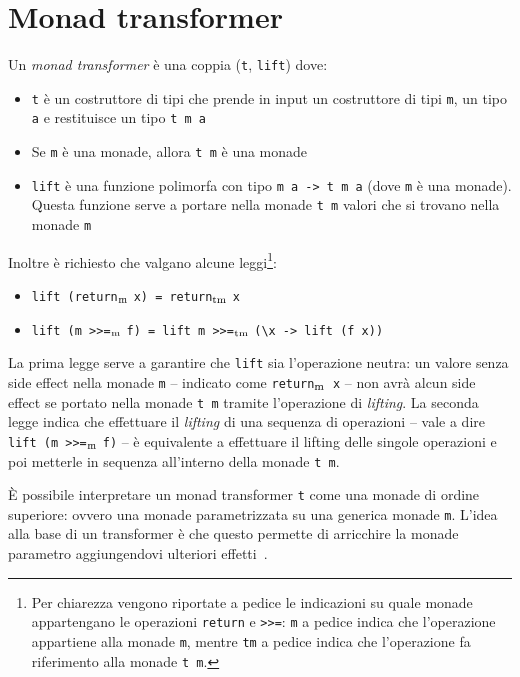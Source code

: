 \section{Monad transformer}

Un \emph{monad transformer} è una coppia (\lstinline{t}, \lstinline{lift}) dove:
\begin{itemize}
  \item \lstinline{t} è un costruttore di tipi che prende in input un costruttore di tipi \lstinline{m}, un tipo \lstinline{a} e restituisce un tipo \lstinline{t m a}
  \item Se \lstinline{m} è una monade, allora \lstinline{t m} è una monade
  \item \lstinline{lift} è una funzione polimorfa con tipo \lstinline{m a -> t m a} (dove \lstinline{m} è una monade). Questa funzione serve a portare nella monade \lstinline{t m} valori che si trovano nella monade \lstinline{m}
\end{itemize}

Inoltre è richiesto che valgano alcune leggi\footnote{Per chiarezza vengono riportate a pedice le indicazioni su quale monade appartengano le operazioni \lstinline{return} e \lstinline{>>=}: \lstinline{m} a pedice indica che l'operazione appartiene alla monade \lstinline{m}, mentre \lstinline{tm} a pedice indica che l'operazione fa riferimento alla monade \lstinline{t m}.}:
\begin{itemize}
  \item \lstinline{lift (return}$_\text{\lstinline{m}}$ \lstinline{x) = return}$_\text{\lstinline{tm}}$ \lstinline{x}
  \item \lstinline{lift (m >>=}$_\text{\lstinline{m}}$ \lstinline{f) = lift m >>=}$_\text{\lstinline{tm}}$ \lstinline{(\x -> lift (f x))}
\end{itemize}

La prima legge serve a garantire che \lstinline{lift} sia l'operazione neutra: un valore senza side effect nella monade \lstinline{m} -- indicato come \lstinline{return}$_\text{\lstinline{m}}$\lstinline{ x} -- non avrà alcun side effect se portato nella monade \lstinline{t m} tramite l'operazione di \emph{lifting}. La seconda legge indica che effettuare il \emph{lifting} di una sequenza di operazioni -- vale a dire \lstinline{lift (m >>=}$_\text{\lstinline{m}}$ \lstinline{f)} -- è equivalente a effettuare il lifting delle singole operazioni e poi metterle in sequenza all'interno della monade \lstinline{t m}.

È possibile interpretare un monad transformer \lstinline{t} come una monade di ordine superiore: ovvero una monade parametrizzata su una generica monade \lstinline{m}. L'idea alla base di un transformer è che questo permette di arricchire la monade parametro aggiungendovi ulteriori effetti~\cite{cit:monad-transformers-and-modular-interpreters}.

